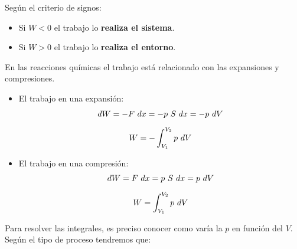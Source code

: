Según el criterio de signos:

\begin{itemize}
    \item Si \(W<0\) el trabajo lo \textbf{realiza el sistema}.
    \item Si \(W>0\) el trabajo lo \textbf{realiza el entorno}.
\end{itemize}

En las reacciones químicas el trabajo está relacionado con las expansiones y compresiones.

\begin{itemize}
    \item El trabajo en una expansión:
    \begin{gather*}
        dW = -F\ dx = -p\ S\ dx = -p\ dV \separ
        W = - \int_{V_1}^{V_2} p\ dV
    \end{gather*}
    \item El trabajo en una compresión:
    \begin{gather*}
        dW = F\ dx = p\ S\ dx = p\ dV \separ
        W =  \int_{V_1}^{V_2} p\ dV
    \end{gather*}
\end{itemize}

Para resolver las integrales, es preciso conocer como varía la \(p\) en función del \(V\).
Según el tipo de proceso tendremos que:

